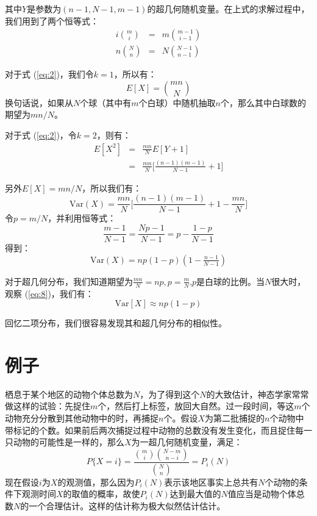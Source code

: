 \documentclass[10pt,a4paper,UTF8]{article}
\begin{document}
其中\(Y\)是参数为\((n-1,N-1,m-1)\)的超几何随机变量。在上式的求解过程中，我们用到了两个恒等式：
\begin{eqnarray}
\label{eq:3}
i\binom{m}{i}&=&m\binom{m-1}{i-1} \\
n\binom{N}{n}&=&N\binom{N-1}{n-1}
\end{eqnarray}

对于式 (\ref{eq:2})，我们令\(k=1\)，所以有：
\begin{equation}
\label{eq:4}
E[X] = \binom{mn}{N}
\end{equation}
换句话说，如果从\(N\)个球（其中有\(m\)个白球）中随机抽取\(n\)个，那么其中白球数的期望为\(mn/N\)。

对于式 (\ref{eq:2})，令\(k=2\)，则有：
\begin{eqnarray}
\label{eq:5}
E[X^{2}]&=& \frac{mn}{N}E[Y+1] \\
&=& \frac{mn}{N}\bigg[ \frac{(n-1)(m-1)}{N-1} + 1 \bigg]
\end{eqnarray}

另外\(E[X] = mn/N\)，所以我们有：
\begin{equation}
\label{eq:6}
\mathrm{Var}(X) = \frac{mn}{N}\bigg[ \frac{(n-1)(m-1)}{N-1} + 1 - \frac{mn}{N}\bigg]
\end{equation}
令\(p=m/N\)，并利用恒等式：
\begin{equation}
\label{eq:7}
\frac{m-1}{N-1} = \frac{Np-1}{N-1} = p - \frac{1-p}{N-1}
\end{equation}
得到：
\begin{equation}
\label{eq:8}
\mathrm{Var}(X) = np(1-p)(1-\tfrac{n-1}{N-1})
\end{equation}

对于超几何分布，我们知道期望为\(\frac{mn}{N} = np ,p = \frac{m}{N}\),\(p\)是白球的比例。当\(N\)很大时，观察 (\ref{eq:8})，我们有：
\begin{equation}
\label{eq:9}
\mathrm{Var}[X] \approx np(1-p)
\end{equation}

回忆二项分布，我们很容易发现其和超几何分布的相似性。
\section{例子}
\label{sec:orgeaac9eb}


栖息于某个地区的动物个体总数为\(N\)，为了得到这个\(N\)的大致估计，神态学家常常做这样的试验：先捉住\(m\)个，然后打上标签，放回大自然。过一段时间，等这\(m\)个动物充分分散到其他动物中的时，再捕捉\(n\)个。假设\(X\)为第二批捕捉的\(n\)个动物中带标记的个数。如果前后两次捕捉过程中动物的总数没有发生变化，而且捉住每一只动物的可能性是一样的，那么\(X\)为一超几何随机变量，满足：
\begin{equation}
\label{eq:10}
P\{X = i\} = \frac{\binom{m}{i} \binom{N-m}{n-i}}{\binom{N}{n}} = P_{i}(N)
\end{equation}
现在假设\(i\)为\(X\)的观测值，那么因为\(P_{i}(N)\)表示该地区事实上总共有\(N\)个动物的条件下观测时间\(X\)的取值的概率，故使\(P_{i}(N)\)达到最大值的\(N\)值应当是动物个体总数\(N\)的一个合理估计。这样的估计称为极大似然估计估计。
\end{document}
